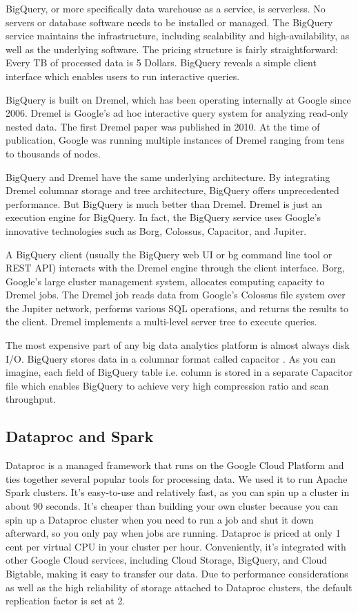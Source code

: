 \documentclass[a4paper,12pt]{article}
\begin{document}
BigQuery, or more specifically data warehouse as a service, is serverless. No servers or database software needs to be
installed or managed. The BigQuery service maintains the infrastructure, including scalability and high-availability,
as well as the underlying software. The pricing structure is fairly straightforward: Every TB of processed data is 5
Dollars. BigQuery reveals a simple client interface which enables users to run interactive queries.


BigQuery is built on  Dremel\cite{Dremel}, which has been operating internally at Google since 2006. Dremel is Google's
ad hoc interactive  query system for analyzing read-only nested data. The first Dremel paper was published in 2010.
At the time of publication, Google was running multiple instances of Dremel ranging from tens to thousands of nodes.

BigQuery and Dremel have the same underlying architecture. By integrating Dremel columnar storage and tree architecture,
BigQuery offers unprecedented performance. But BigQuery is much better than Dremel. Dremel is just an execution engine for BigQuery. In fact, the BigQuery service uses Google's innovative technologies such as Borg\cite{Borg}, Colossus, Capacitor, and Jupiter.

A BigQuery client (usually the BigQuery web UI or bg command line tool or REST API) interacts with the Dremel engine
through the client interface. Borg, Google's large cluster management system, allocates computing capacity to Dremel
jobs. The Dremel job reads data from Google's Colossus file system over the Jupiter network, performs various SQL
operations, and returns the results to the client. Dremel implements a multi-level server tree to execute queries.

The most expensive part of any big data analytics platform is almost always disk I/O. BigQuery stores data in a columnar
format called capacitor\cite{StoringDremel} . As you can imagine, each field of BigQuery table i.e. column is stored in
a separate Capacitor file which enables BigQuery to achieve very high compression ratio and scan throughput.

\subsection{Dataproc and Spark}
\label{sec:spark}
Dataproc is a managed framework that runs on the Google Cloud Platform and ties together several popular tools for processing data.
We used it to run Apache Spark clusters. It's easy-to-use and relatively fast, as you can spin up a cluster in about 90 seconds.
It’s cheaper than building your own cluster because you can spin up a Dataproc cluster when you need to run a job and
shut it down afterward, so you only pay when jobs are running. Dataproc is priced at only 1 cent per virtual CPU in your
cluster per hour. Conveniently, it’s integrated with other Google Cloud services, including Cloud Storage, BigQuery, and
Cloud Bigtable, making it easy to transfer our data. Due to performance considerations as well as the high reliability of
storage attached to Dataproc clusters, the default replication factor is set at 2.
\end{document}

